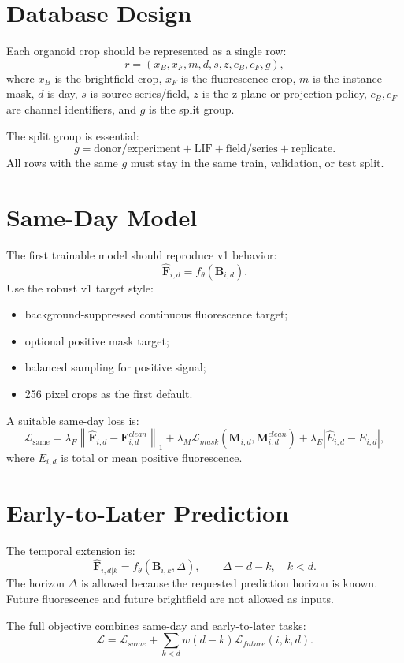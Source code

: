 \documentclass[11pt]{article}
\newcommand{\B}{\mathbf{B}}
\newcommand{\F}{\mathbf{F}}
\newcommand{\M}{\mathbf{M}}
\begin{document}
\section{Database Design}
Each organoid crop should be represented as a single row:
\[
r = (x_B, x_F, m, d, s, z, c_B, c_F, g),
\]
where \(x_B\) is the brightfield crop, \(x_F\) is the fluorescence crop, \(m\) is the instance mask, \(d\) is day, \(s\) is source series/field, \(z\) is the z-plane or projection policy, \(c_B,c_F\) are channel identifiers, and \(g\) is the split group.

The split group is essential:
\[
g = \mathrm{donor/experiment} + \mathrm{LIF} + \mathrm{field/series} + \mathrm{replicate}.
\]
All rows with the same \(g\) must stay in the same train, validation, or test split.

\section{Same-Day Model}
The first trainable model should reproduce v1 behavior:
\[
\hat{\F}_{i,d}=f_\theta(\B_{i,d}).
\]
Use the robust v1 target style:
\begin{itemize}[leftmargin=1.5em]
  \item background-suppressed continuous fluorescence target;
  \item optional positive mask target;
  \item balanced sampling for positive signal;
  \item 256 pixel crops as the first default.
\end{itemize}

A suitable same-day loss is:
\[
\mathcal{L}_{\mathrm{same}}
=
\lambda_F \left\|\hat{\F}_{i,d}-\F^{clean}_{i,d}\right\|_1
+\lambda_M\mathcal{L}_{mask}(\hat{\M}_{i,d},\M^{clean}_{i,d})
+\lambda_E\left|\hat{E}_{i,d}-E_{i,d}\right|,
\]
where \(E_{i,d}\) is total or mean positive fluorescence.

\section{Early-to-Later Prediction}
The temporal extension is:
\[
\hat{\F}_{i,d|k}=f_\theta(\B_{i,k}, \Delta),\qquad \Delta=d-k,\quad k<d .
\]
The horizon \(\Delta\) is allowed because the requested prediction horizon is known. Future fluorescence and future brightfield are not allowed as inputs.

The full objective combines same-day and early-to-later tasks:
\[
\mathcal{L}
=
\mathcal{L}_{same}
+
\sum_{k<d} w(d-k)\mathcal{L}_{future}(i,k,d).
\]
\end{document}
